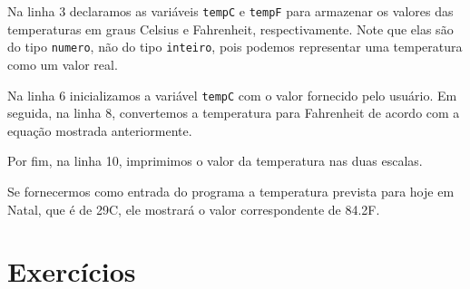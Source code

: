 \documentclass{report}
\begin{document}
Na linha 3 declaramos as variáveis \texttt{tempC} e \texttt{tempF} para armazenar
os valores das temperaturas em graus Celsius e Fahrenheit, respectivamente. Note
que elas são do tipo \texttt{numero}, não do tipo \texttt{inteiro}, pois podemos
representar uma temperatura como um valor real.

Na linha 6 inicializamos a variável \texttt{tempC} com o valor fornecido pelo usuário.
Em seguida, na linha 8, convertemos a temperatura para Fahrenheit de acordo com a
equação mostrada anteriormente.

Por fim, na linha 10, imprimimos o valor da temperatura nas duas escalas.

Se fornecermos como entrada do programa a temperatura prevista para hoje em Natal,
que é de 29\degree C, ele mostrará o valor correspondente de 84.2\degree F.


\section{Exercícios}
\end{document}
